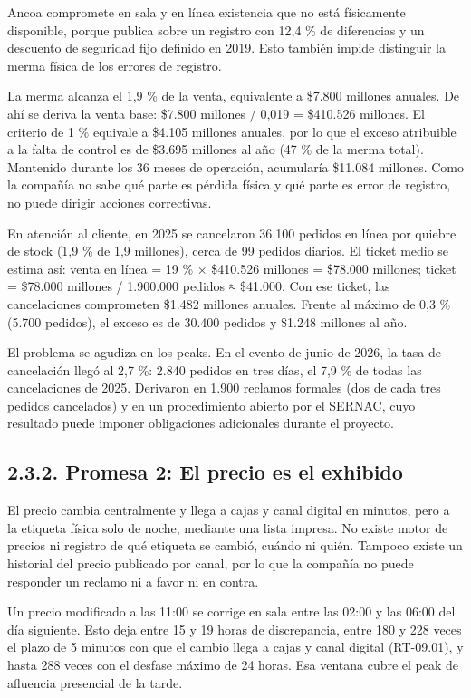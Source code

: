 \documentclass[11pt]{article}
\begin{document}
Ancoa compromete en sala y en línea existencia que no está físicamente disponible, porque publica sobre un registro con 12,4 \% de diferencias y un descuento de seguridad fijo definido en 2019. Esto también impide distinguir la merma física de los errores de registro.

La merma alcanza el 1,9 \% de la venta, equivalente a \$7.800 millones anuales. De ahí se deriva la venta base: \$7.800 millones / 0,019 = \$410.526 millones. El criterio de 1 \% equivale a \$4.105 millones anuales, por lo que el exceso atribuible a la falta de control es de \$3.695 millones al año (47 \% de la merma total). Mantenido durante los 36 meses de operación, acumularía \$11.084 millones. Como la compañía no sabe qué parte es pérdida física y qué parte es error de registro, no puede dirigir acciones correctivas.

En atención al cliente, en 2025 se cancelaron 36.100 pedidos en línea por quiebre de stock (1,9 \% de 1,9 millones), cerca de 99 pedidos diarios. El ticket medio se estima así: venta en línea = 19 \% × \$410.526 millones = \$78.000 millones; ticket = \$78.000 millones / 1.900.000 pedidos ≈ \$41.000. Con ese ticket, las cancelaciones comprometen \$1.482 millones anuales. Frente al máximo de 0,3 \% (5.700 pedidos), el exceso es de 30.400 pedidos y \$1.248 millones al año.

El problema se agudiza en los peaks. En el evento de junio de 2026, la tasa de cancelación llegó al 2,7 \%: 2.840 pedidos en tres días, el 7,9 \% de todas las cancelaciones de 2025. Derivaron en 1.900 reclamos formales (dos de cada tres pedidos cancelados) y en un procedimiento abierto por el SERNAC, cuyo resultado puede imponer obligaciones adicionales durante el proyecto.

\subsection{2.3.2. Promesa 2: El precio es el exhibido}\label{promesa-2-el-precio-es-el-exhibido}

El precio cambia centralmente y llega a cajas y canal digital en minutos, pero a la etiqueta física solo de noche, mediante una lista impresa. No existe motor de precios ni registro de qué etiqueta se cambió, cuándo ni quién. Tampoco existe un historial del precio publicado por canal, por lo que la compañía no puede responder un reclamo ni a favor ni en contra.

Un precio modificado a las 11:00 se corrige en sala entre las 02:00 y las 06:00 del día siguiente. Esto deja entre 15 y 19 horas de discrepancia, entre 180 y 228 veces el plazo de 5 minutos con que el cambio llega a cajas y canal digital (RT-09.01), y hasta 288 veces con el desfase máximo de 24 horas. Esa ventana cubre el peak de afluencia presencial de la tarde.
\end{document}
